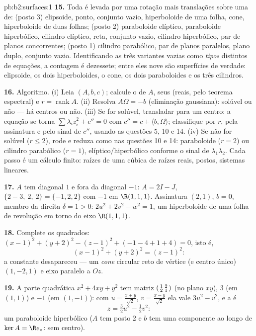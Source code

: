 \begin{solution}{pb:b2:surfaces:1}
\textbf{15.} Toda  é levada por uma rotação mais
translações sobre uma de: (posto 3) elipsoide, ponto, conjunto
vazio, hiperboloide de uma folha, cone, hiperboloide de duas folhas;
(posto 2) paraboloide elíptico, paraboloide hiperbólico, cilindro
elíptico, reta, conjunto vazio, cilindro hiperbólico, par de
planos concorrentes; (posto 1) cilindro parabólico, par de
planos paralelos, plano duplo, conjunto vazio. Identificando as
três variantes vazias como \emph{tipos } distintos de
equações, a contagem é dezessete; entre eles nove são superfícies
de verdade: elipsoide, os dois hiperboloides, o cone, os dois
paraboloides e os três cilindros.

\textbf{16.} Algoritmo. (i) Leia $(A, b, c)$; calcule o
 de $A$, seus  (reais, pelo
teorema espectral) e $r = \operatorname{rank}A$. (ii)
Resolva $A\Omega = -b$ (eliminação gaussiana): solúvel ou não
--- há centros ou não. (iii) Se for solúvel, transladar para um centro:
a equação se torna $\sum\lambda_iz_i^2 + c'' = 0$ com $c''
= c + \langle b, \Omega\rangle$; classifique por $r$, pela assinatura
e pelo sinal de $c''$, usando as questões 5, 10 e 14. (iv) Se não
for solúvel ($r \leq 2$), rode e reduza como nas questões 10
e 14: paraboloide ($r = 2$) ou cilindro parabólico ($r = 1$),
elíptico/hiperbólico conforme o sinal de
$\lambda_1\lambda_2$. Cada passo é um cálculo finito:
raízes de uma cúbica de raízes reais, postos, sistemas lineares.

\textbf{17.} $A$ tem diagonal $1$ e fora da diagonal $-1$: $A = 2I
- J$,  $\{2 - 3,\ 2,\ 2\} = \{-1, 2, 2\}$ com $-1$
em $\R(1,1,1)$. Assinatura $(2,1)$, $b = 0$, membro da direita
$\delta = 1 > 0$: $2u^2 + 2v^2 - w^2 = 1$, um hiperboloide de uma
folha de revolução em torno do eixo $\R(1,1,1)$.

\textbf{18.} Complete os quadrados: $(x-1)^2 + (y+2)^2 - (z-1)^2 +
(-1 - 4 + 1 + 4) = 0$, isto é,
\[
(x-1)^2 + (y+2)^2 = (z-1)^2 :
\]
a constante desapareceu --- um \emph{cone} circular reto de
vértice (e centro único) $(1, -2, 1)$ e eixo paralelo a
$Oz$.

\textbf{19.} A parte quadrática $x^2 + 4xy + y^2$ tem matriz
$\begin{psmallmatrix}1 & 2\\ 2 & 1\end{psmallmatrix}$ (no plano
$xy$),  $3$ (em $(1,1)$) e $-1$ (em
$(1,-1)$): com $u = \frac{x+y}{\sqrt2}$, $v =
\frac{x-y}{\sqrt2}$ ela vale $3u^2 - v^2$, e a 
é
\[
z = \tfrac32u^2 - \tfrac12v^2 :
\]
um paraboloide hiperbólico ($A$ tem posto $2$ e $b$ tem uma
componente ao longo de $\ker A = \R e_z$: sem centro).


\end{solution}
